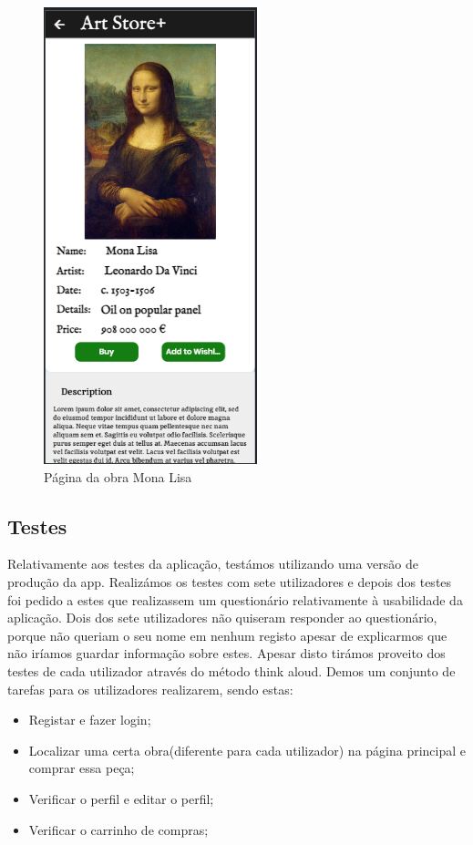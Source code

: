 \documentclass[conference]{IEEEtran}
\begin{document}
\begin{figure}[h]
    \centering
    \includegraphics[scale=0.4]{artpiecepage-mona-lisa.png}
    \caption{Página da obra Mona Lisa}
    \label{fig:artpiece}
\end{figure}

\subsection{Testes}

Relativamente aos testes da aplicação, testámos utilizando uma versão de produção da app. 
Realizámos os testes com sete utilizadores e depois dos testes foi pedido a estes que 
realizassem um questionário relativamente à usabilidade da aplicação. 
Dois dos sete utilizadores não quiseram responder ao questionário, 
porque não queriam o seu nome em nenhum registo apesar de explicarmos que 
não iríamos guardar informação sobre estes. Apesar disto tirámos proveito 
dos testes de cada utilizador através do método think aloud. Demos um conjunto de 
tarefas para os utilizadores realizarem, sendo estas:

\begin{itemize}
    \item Registar e fazer login;
    \item Localizar uma certa obra(diferente para cada utilizador) na página principal e comprar essa peça;
    \item Verificar o perfil e editar o perfil;
    \item Verificar o carrinho de compras;
\end{itemize}
\end{document}
